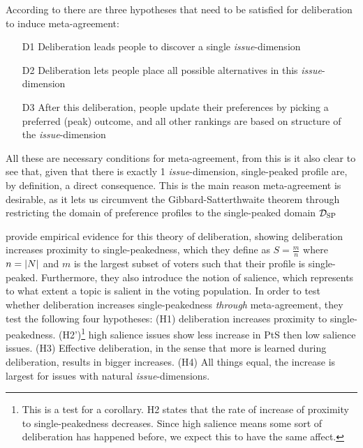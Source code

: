 According to \citet{listTwoConceptsAgreement2002} there are three hypotheses that need to be satisfied for deliberation to induce meta-agreement:
\begin{enumerate}
	\label{list:meta-agreement-checklist}
	\setlength\itemsep{1px}
	\item [D1] Deliberation leads people to discover a single \textit{issue}-dimension
	\item [D2] Deliberation lets people place all possible alternatives in this \textit{issue}-dimension
	\item [D3] After this deliberation, people update their preferences by picking a preferred (peak) outcome, and all other rankings are based on structure of the \textit{issue}-dimension
\end{enumerate}

All these are necessary conditions for meta-agreement, from this is it also clear to see that, given that there is exactly 1 \textit{issue}-dimension, single-peaked profile are, by definition, a direct consequence. This is the main reason meta-agreement is desirable, as it lets us circumvent the Gibbard-Satterthwaite theorem \citep{gibbardManipulationVotingSchemes1973, satterthwaiteStrategyproofnessArrowsConditions1975} through restricting the domain of preference profiles to the single-peaked domain $\mathcal{D}_{\textnormal{SP}}$


\citet{listDeliberationSinglePeakednessPossibility2013} provide empirical evidence for this theory of deliberation, showing deliberation increases proximity to single-peakedness, which they define as $S= \frac{m}{n}$ where $n = |N|$ and $m$ is the largest subset of voters such that their profile is single-peaked. Furthermore, they also introduce the notion of salience, which represents to what extent a topic is salient in the voting population. In order to test whether deliberation increases single-peakedness \textit{through} meta-agreement, they test the following four hypotheses: (H1) deliberation increases proximity to single-peakedness. (H2')\footnote{This is a test for a corollary. H2 states that the rate of increase of proximity to single-peakedness decreases. Since high salience means some sort of deliberation has happened before, we expect this to have the same affect.} high salience issues show less increase in PtS then low salience issues. (H3) Effective deliberation, in the sense that more is learned during deliberation, results in bigger increases. (H4) All things equal, the increase is largest for issues with natural \textit{issue}-dimensions.

